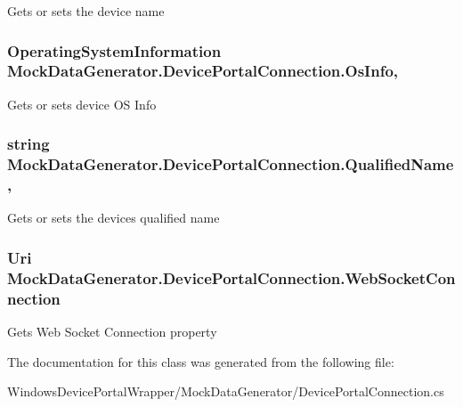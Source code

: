 Gets or sets the device name 

\subsubsection[{\texorpdfstring{Os\+Info}{OsInfo}}]{\setlength{\rightskip}{0pt plus 5cm}Operating\+System\+Information Mock\+Data\+Generator.\+Device\+Portal\+Connection.\+Os\+Info\hspace{0.3cm}{\ttfamily [get]}, {\ttfamily [set]}}\hypertarget{class_mock_data_generator_1_1_device_portal_connection_a499145c3081565d262b4bb60c6fe4e0c}{}\label{class_mock_data_generator_1_1_device_portal_connection_a499145c3081565d262b4bb60c6fe4e0c}


Gets or sets device OS Info 

\subsubsection[{\texorpdfstring{Qualified\+Name}{QualifiedName}}]{\setlength{\rightskip}{0pt plus 5cm}string Mock\+Data\+Generator.\+Device\+Portal\+Connection.\+Qualified\+Name\hspace{0.3cm}{\ttfamily [get]}, {\ttfamily [set]}}\hypertarget{class_mock_data_generator_1_1_device_portal_connection_a23c51fb6aa66c16bc370b3acb0d7c102}{}\label{class_mock_data_generator_1_1_device_portal_connection_a23c51fb6aa66c16bc370b3acb0d7c102}


Gets or sets the device\textquotesingle{}s qualified name 

\subsubsection[{\texorpdfstring{Web\+Socket\+Connection}{WebSocketConnection}}]{\setlength{\rightskip}{0pt plus 5cm}Uri Mock\+Data\+Generator.\+Device\+Portal\+Connection.\+Web\+Socket\+Connection\hspace{0.3cm}{\ttfamily [get]}}\hypertarget{class_mock_data_generator_1_1_device_portal_connection_a73ce316c04e2eb3c26677441bf832c59}{}\label{class_mock_data_generator_1_1_device_portal_connection_a73ce316c04e2eb3c26677441bf832c59}


Gets Web Socket Connection property 



The documentation for this class was generated from the following file\+:\begin{DoxyCompactItemize}
\item 
Windows\+Device\+Portal\+Wrapper/\+Mock\+Data\+Generator/Device\+Portal\+Connection.\+cs\end{DoxyCompactItemize}
